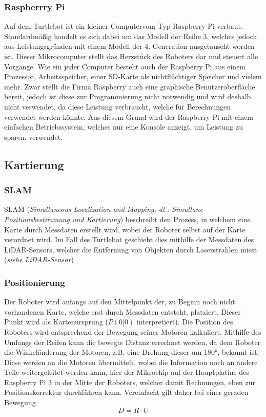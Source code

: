 {{		\subsubsection{Raspberrry Pi}
		{
			Auf dem Turtlebot ist ein kleiner Computervom Typ Raspberry Pi verbaut. Standardmäßig handelt es sich dabei um das Modell der Reihe 3, welches jedoch aus Leistungsgründen mit einem Modell der 4. Generation ausgetauscht worden ist. Dieser Mikrocomputer stellt das Herzstück des Roboters dar und steuert alle Vorgänge. Wie ein jeder Computer besteht auch der Raspberry Pi aus einem Prozessor, Arbeitsspeicher, einer SD-Karte als nichtflüchtiger Speicher und vielem mehr. Zwar stellt die Firma Raspberry auch eine graphische Benutzeroberfläche bereit, jedoch ist diese zur Programmierung nicht notwendig und wird deshalb nicht verwendet, da diese Leistung verbraucht, welche für Berechnungen verwendet werden könnte. Aus diesem Grund wird der Raspberry Pi mit einem einfachen Betriebssystem, welches nur eine Konsole anzeigt, um Leistung zu sparen, verwendet.
		}
	}
	\subsection{Kartierung}
	{
		\subsubsection{SLAM}
		{
			SLAM (\emph{Simultaneous Localization and Mapping, dt.: Simultane Positionsbestimmung und Kartierung}) beschreibt den Prozess, in welchem eine Karte durch Messdaten erstellt wird, wobei der Roboter selbst auf der Karte verordnet wird.
			Im Fall des Turtlebot geschieht dies mithilfe der Messdaten des LiDAR-Sensors, welcher die Entfernung von Objekten durch Laserstrahlen misst (\emph{siehe LiDAR-Sensor})	
		}
		
		\subsubsection{Positionierung}
		{
			Der Roboter wird anfangs auf den Mittelpunkt der, zu Beginn noch nicht vorhandenen Karte, welche erst durch Messdaten entsteht, platziert. Dieser Punkt wird als Kartenursprung ($P(0|0)$ interpretiert). Die Position des Roboters wird entsprechend der Bewegung seiner Motoren kalkuliert. Mithilfe des Umfangs der Reifen kann die bewegte Distanz errechnet werden, da dem Roboter die Winkeländerung der Motoren, z.B. eine Drehung dieser um 180°, bekannt ist. Diese werden an die Motoren übermittelt, wobei die Information noch an andere Teile weitergeleitet werden kann, hier der Mikrochip auf der Hauptplatine des Raspberry Pi 3 in der Mitte der Roboters, welcher damit Rechnungen, eben zur Positionskorrektur durchführen kann. Vereinfacht gilt daher bei einer geraden Bewegung
			\begin{equation}
				D = R \cdot U
			\end{equation} 
			
}}}
